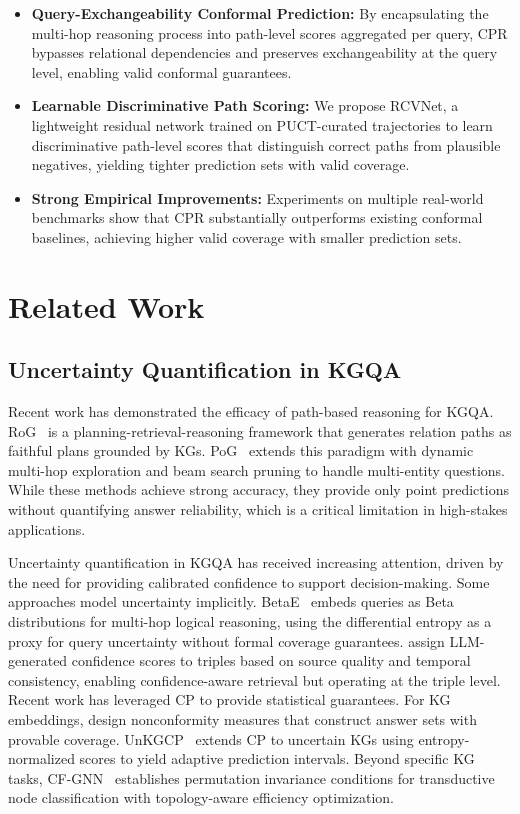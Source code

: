 \documentclass{article}
\theoremstyle{plain}
\theoremstyle{definition}
\theoremstyle{remark}
\begin{document}
\vspace{-10pt}
\begin{itemize}[leftmargin=*,itemsep=-1pt]
    \item \textbf{Query-Exchangeability Conformal Prediction:} 
    By encapsulating the multi-hop reasoning process into path-level scores aggregated per query, CPR bypasses relational dependencies and preserves exchangeability at the query level, enabling valid conformal guarantees.
    \item \textbf{Learnable Discriminative Path Scoring:} 
    We propose RCVNet, a lightweight residual network trained on PUCT-curated trajectories to learn discriminative path-level scores that distinguish correct paths from plausible negatives, yielding tighter prediction sets with valid coverage.
    \item \textbf{Strong Empirical Improvements:} Experiments on multiple real-world benchmarks show that CPR substantially outperforms existing conformal baselines, achieving higher valid coverage with smaller prediction sets.
\end{itemize}
\section{Related Work}

\subsection{Uncertainty Quantification in KGQA}
Recent work has demonstrated the efficacy of path-based reasoning for KGQA.
RoG~\citep{RoG} is a planning-retrieval-reasoning framework that generates relation paths as faithful plans grounded by KGs.
PoG~\citep{PoG} extends this paradigm with dynamic multi-hop exploration and beam search pruning to handle multi-entity questions.
While these methods achieve strong accuracy, they provide only point predictions without quantifying answer reliability, which is a critical limitation in high-stakes applications.

Uncertainty quantification in KGQA has received increasing attention, driven by the need for providing calibrated confidence to support decision-making. Some approaches model uncertainty implicitly. BetaE~\citep{Ren2020BetaEFA} embeds queries as Beta distributions for multi-hop logical reasoning, using the differential entropy as a proxy for query uncertainty without formal coverage guarantees. \citet{Takeuchi2025UncertaintyAwareDKA} assign LLM-generated confidence scores to triples based on source quality and temporal consistency, enabling confidence-aware retrieval but operating at the triple level. Recent work has leveraged CP to provide statistical guarantees. For KG embeddings, \citet{zhu_cp_answerSet} design nonconformity measures that construct answer sets with provable coverage. UnKGCP~\citep{UnKGE} extends CP to uncertain KGs using entropy-normalized scores to yield adaptive prediction intervals. Beyond specific KG tasks, CF-GNN~\citep{cp_gnn} establishes permutation invariance conditions for transductive node classification with topology-aware efficiency optimization. 
\end{document}
